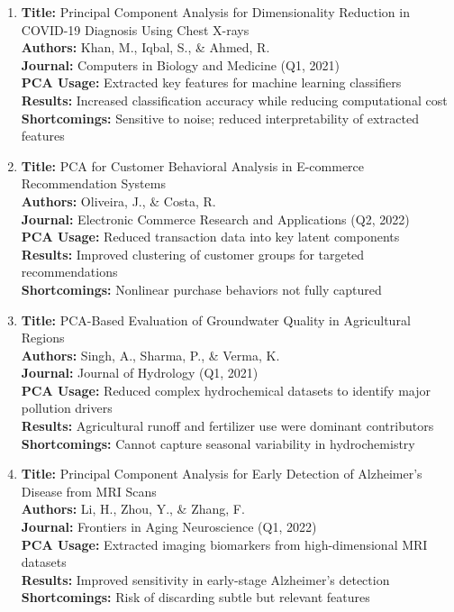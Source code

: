 \documentclass[a4paper,12pt]{article}
\begin{document}
\begin{enumerate}[leftmargin=*]
\item \textbf{Title:} Principal Component Analysis for Dimensionality Reduction in COVID-19 Diagnosis Using Chest X-rays  \\
\textbf{Authors:} Khan, M., Iqbal, S., \& Ahmed, R.  \\
\textbf{Journal:} Computers in Biology and Medicine (Q1, 2021)  \\
\textbf{PCA Usage:} Extracted key features for machine learning classifiers  \\
\textbf{Results:} Increased classification accuracy while reducing computational cost  \\
\textbf{Shortcomings:} Sensitive to noise; reduced interpretability of extracted features  \\

\item \textbf{Title:} PCA for Customer Behavioral Analysis in E-commerce Recommendation Systems  \\
\textbf{Authors:} Oliveira, J., \& Costa, R.  \\
\textbf{Journal:} Electronic Commerce Research and Applications (Q2, 2022)  \\
\textbf{PCA Usage:} Reduced transaction data into key latent components  \\
\textbf{Results:} Improved clustering of customer groups for targeted recommendations  \\
\textbf{Shortcomings:} Nonlinear purchase behaviors not fully captured  \\

\item \textbf{Title:} PCA-Based Evaluation of Groundwater Quality in Agricultural Regions  \\
\textbf{Authors:} Singh, A., Sharma, P., \& Verma, K.  \\
\textbf{Journal:} Journal of Hydrology (Q1, 2021)  \\
\textbf{PCA Usage:} Reduced complex hydrochemical datasets to identify major pollution drivers  \\
\textbf{Results:} Agricultural runoff and fertilizer use were dominant contributors  \\
\textbf{Shortcomings:} Cannot capture seasonal variability in hydrochemistry  \\

\item \textbf{Title:} Principal Component Analysis for Early Detection of Alzheimer’s Disease from MRI Scans  \\
\textbf{Authors:} Li, H., Zhou, Y., \& Zhang, F.  \\
\textbf{Journal:} Frontiers in Aging Neuroscience (Q1, 2022)  \\
\textbf{PCA Usage:} Extracted imaging biomarkers from high-dimensional MRI datasets  \\
\textbf{Results:} Improved sensitivity in early-stage Alzheimer’s detection  \\
\textbf{Shortcomings:} Risk of discarding subtle but relevant features  \\


\end{enumerate}
\end{document}

